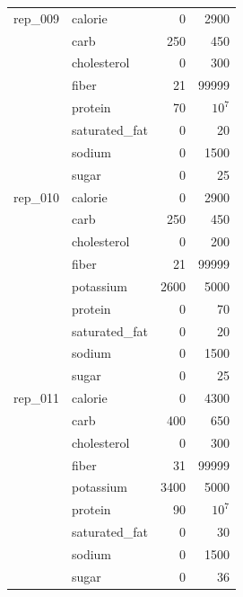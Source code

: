 \begin{tabular}{@{}clrr@{}}
\midrule
rep\_009 & calorie & 0 & 2900 \\
 & carb & 250 & 450 \\
 & cholesterol & 0 & 300 \\
 & fiber & 21 & 99999 \\
 & protein & 70 & $10^{7}$ \\
 & saturated\_fat & 0 & 20 \\
 & sodium & 0 & 1500 \\
 & sugar & 0 & 25 \\
\midrule
rep\_010 & calorie & 0 & 2900 \\
 & carb & 250 & 450 \\
 & cholesterol & 0 & 200 \\
 & fiber & 21 & 99999 \\
 & potassium & 2600 & 5000 \\
 & protein & 0 & 70 \\
 & saturated\_fat & 0 & 20 \\
 & sodium & 0 & 1500 \\
 & sugar & 0 & 25 \\
\midrule
rep\_011 & calorie & 0 & 4300 \\
 & carb & 400 & 650 \\
 & cholesterol & 0 & 300 \\
 & fiber & 31 & 99999 \\
 & potassium & 3400 & 5000 \\
 & protein & 90 & $10^{7}$ \\
 & saturated\_fat & 0 & 30 \\
 & sodium & 0 & 1500 \\
 & sugar & 0 & 36 \\
\bottomrule
\end{tabular}